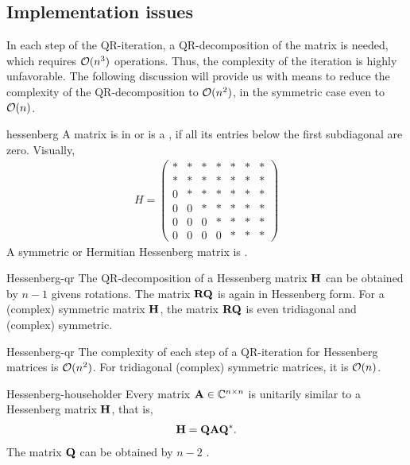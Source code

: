 \subsection{Implementation issues}
\begin{intro}
  In each step of the QR-iteration, a QR-decomposition of the matrix
  is needed, which requires $\mathcal O(n^3)$ operations. Thus, the
  complexity of the iteration is highly unfavorable. The following
  discussion will provide us with means to reduce the complexity of
  the QR-decomposition to $\mathcal O(n^2)$, in the symmetric case even to
  $\mathcal O(n)$.
\end{intro}

\begin{Definition}{hessenberg}
  A matrix is in  or is a , if all its entries below the first subdiagonal are zero. Visually,
  \begin{gather}
    H = 
    \begin{pmatrix}
      *&*&*&*&*&*&*\\
      *&*&*&*&*&*&*\\
      0&*&*&*&*&*&*\\
      0&0&*&*&*&*&*\\
      0&0&0&*&*&*&*\\
      0&0&0&0&*&*&*
    \end{pmatrix}
  \end{gather}
  A symmetric or Hermitian Hessenberg matrix is .
\end{Definition}

\begin{Theorem}{Hessenberg-qr}
  The QR-decomposition of a Hessenberg matrix $\mathbf H$ can be obtained
  by $n-1$ givens rotations. The matrix $\mathbf R\mathbf Q$ is again in
  Hessenberg form. For a (complex) symmetric matrix $\mathbf H$, the
  matrix $\mathbf R\mathbf Q$ is even tridiagonal and (complex) symmetric.
\end{Theorem}

\begin{Corollary}{Hessenberg-qr}
  The complexity of each step of a QR-iteration for Hessenberg matrices is $\mathcal O(n^2)$. For tridiagonal (complex) symmetric matrices, it is $\mathcal O(n)$.
\end{Corollary}

\begin{Theorem}{Hessenberg-householder}
  Every matrix $\mathbf A\in\mathbb C^{n\times n}$ is unitarily similar to a Hessenberg matrix $\mathbf H$, that is,
  \begin{gather}
    \mathbf H = \mathbf Q \mathbf A \mathbf Q^*.
  \end{gather}
  The matrix $\mathbf Q$ can be obtained by $n-2$ .
\end{Theorem}

